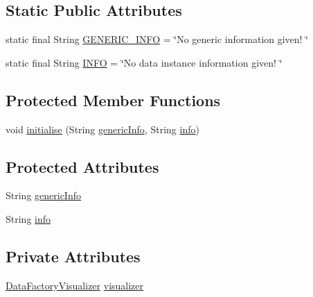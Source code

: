 \subsection*{Static Public Attributes}
\begin{DoxyCompactItemize}
\item 
static final String \hyperlink{classit_1_1emarolab_1_1cagg_1_1core_1_1language_1_1syntax_1_1abstractTree_1_1AbstractNodeData_3_01D_01_4_a26cd9d13d1d05af975d1571578b33755}{G\-E\-N\-E\-R\-I\-C\-\_\-\-I\-N\-F\-O} = \char`\"{}No generic information given! \char`\"{}
\item 
static final String \hyperlink{classit_1_1emarolab_1_1cagg_1_1core_1_1language_1_1syntax_1_1abstractTree_1_1AbstractNodeData_3_01D_01_4_a6b6418feff55aa92262b82c78b008e77}{I\-N\-F\-O} = \char`\"{}No data instance information given! \char`\"{}
\end{DoxyCompactItemize}
\subsection*{Protected Member Functions}
\begin{DoxyCompactItemize}
\item 
void \hyperlink{classit_1_1emarolab_1_1cagg_1_1core_1_1language_1_1syntax_1_1abstractTree_1_1AbstractNodeData_3_01D_01_4_afe80b9cb4640c145646ca936bd72d62e}{initialise} (String \hyperlink{classit_1_1emarolab_1_1cagg_1_1core_1_1language_1_1syntax_1_1abstractTree_1_1AbstractNodeData_3_01D_01_4_a38f86084bc6923753e1355b32581db9e}{generic\-Info}, String \hyperlink{classit_1_1emarolab_1_1cagg_1_1core_1_1language_1_1syntax_1_1abstractTree_1_1AbstractNodeData_3_01D_01_4_acf41532cee5b85597c2407c95f6c1e6f}{info})
\end{DoxyCompactItemize}
\subsection*{Protected Attributes}
\begin{DoxyCompactItemize}
\item 
String \hyperlink{classit_1_1emarolab_1_1cagg_1_1core_1_1language_1_1syntax_1_1abstractTree_1_1AbstractNodeData_3_01D_01_4_a38f86084bc6923753e1355b32581db9e}{generic\-Info}
\item 
String \hyperlink{classit_1_1emarolab_1_1cagg_1_1core_1_1language_1_1syntax_1_1abstractTree_1_1AbstractNodeData_3_01D_01_4_acf41532cee5b85597c2407c95f6c1e6f}{info}
\end{DoxyCompactItemize}
\subsection*{Private Attributes}
\begin{DoxyCompactItemize}
\item 
\hyperlink{classit_1_1emarolab_1_1cagg_1_1core_1_1language_1_1syntax_1_1abstractTree_1_1AbstractDataFactory_1_1DataFactoryVisualizer}{Data\-Factory\-Visualizer} \hyperlink{classit_1_1emarolab_1_1cagg_1_1core_1_1language_1_1syntax_1_1abstractTree_1_1AbstractNodeData_3_01D_01_4_a949280b3bc320e3b0e8be653bd162e0d}{visualizer}
\end{DoxyCompactItemize}


